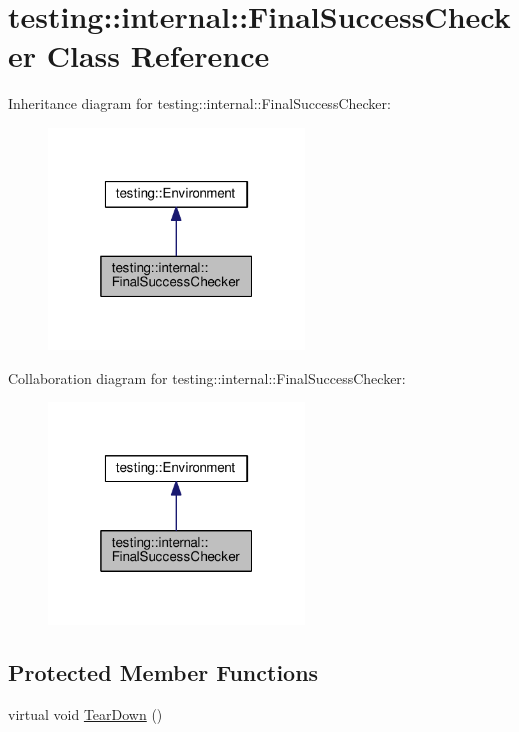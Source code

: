 \hypertarget{classtesting_1_1internal_1_1FinalSuccessChecker}{}\section{testing\+:\+:internal\+:\+:Final\+Success\+Checker Class Reference}
\label{classtesting_1_1internal_1_1FinalSuccessChecker}


Inheritance diagram for testing\+:\+:internal\+:\+:Final\+Success\+Checker\+:
\nopagebreak
\begin{figure}[H]
\begin{center}
\leavevmode
\includegraphics[width=193pt]{classtesting_1_1internal_1_1FinalSuccessChecker__inherit__graph}
\end{center}
\end{figure}


Collaboration diagram for testing\+:\+:internal\+:\+:Final\+Success\+Checker\+:
\nopagebreak
\begin{figure}[H]
\begin{center}
\leavevmode
\includegraphics[width=193pt]{classtesting_1_1internal_1_1FinalSuccessChecker__coll__graph}
\end{center}
\end{figure}
\subsection*{Protected Member Functions}
\begin{DoxyCompactItemize}
\item 
virtual void \hyperlink{classtesting_1_1internal_1_1FinalSuccessChecker_a8f39d12a1f2bfe8c6c04b5c6749382c9}{Tear\+Down} ()
\end{DoxyCompactItemize}
